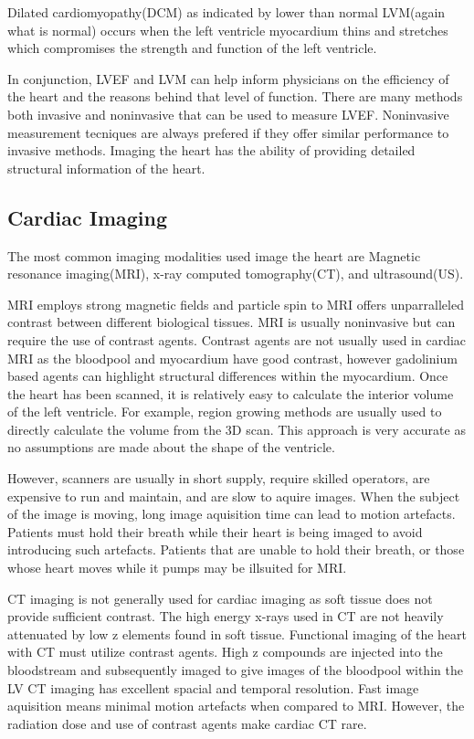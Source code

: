 \documentclass{article}
\begin{document}
Dilated cardiomyopathy(DCM) as indicated by lower than normal LVM(again what is normal) occurs when the left ventricle myocardium thins and stretches which compromises the strength and function of the left ventricle. 

In conjunction, LVEF and LVM can help inform physicians on the efficiency of the heart and the reasons behind that level of function.
There are many methods both invasive and noninvasive that can be used to measure LVEF.
Noninvasive measurement tecniques are always prefered if they offer similar performance to invasive methods.
Imaging the heart has the ability of providing detailed structural information of the heart.

\subsection{Cardiac Imaging}

The most common imaging modalities used image the heart are Magnetic resonance imaging(MRI), x-ray computed tomography(CT), and ultrasound(US).

MRI employs strong magnetic fields and particle spin to 
MRI offers unparralleled contrast between different biological tissues.
MRI is usually noninvasive but can require the use of contrast agents.
Contrast agents are not usually used in cardiac MRI as the bloodpool and myocardium have good contrast, however gadolinium based agents can highlight structural differences within the myocardium.%
Once the heart has been scanned, it is relatively easy to calculate the interior volume of the left ventricle.
For example, region growing methods are usually used  to directly calculate the volume from the 3D scan.
This approach is very accurate as no assumptions are made about the shape of the ventricle.

However, scanners are usually in short supply, require skilled operators, are expensive to run and maintain, and are slow to aquire images.
When the subject of the image is moving, long image aquisition time can lead to motion artefacts.
Patients must hold their breath while their heart is being imaged to avoid introducing such artefacts.
Patients that are unable to hold their breath, or those whose heart moves while it pumps may be illsuited for MRI.

CT imaging is not generally used for cardiac imaging as soft tissue does not provide sufficient contrast.
The high energy x-rays used in CT are not heavily attenuated by low z elements found in soft tissue.
Functional imaging of the heart with CT must utilize contrast agents\cite{EF_soa}.
High z compounds are injected into the bloodstream and subsequently imaged to give images of the bloodpool within the LV
CT imaging has excellent spacial and temporal resolution. 
Fast image aquisition means minimal motion artefacts when compared to MRI.
However, the radiation dose and use of contrast agents make cardiac CT rare.
\end{document}
